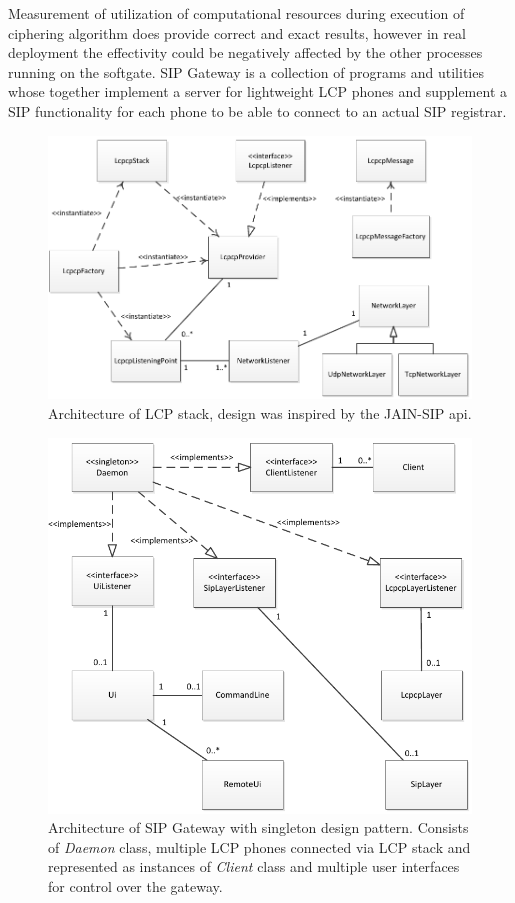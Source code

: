 Measurement of utilization of computational resources during execution of 
ciphering algorithm does provide correct and exact results, however in real 
deployment the effectivity could be negatively affected by the other processes 
running on the softgate. SIP Gateway is a collection of programs and utilities
whose together implement a server for lightweight LCP phones and supplement a
SIP functionality for each phone to be able to connect to an actual SIP 
registrar. 

\begin{figure}[h!]
\centering
\includegraphics[width=15cm]{fig/lcpstack.pdf}
\caption{Architecture of LCP stack, design was inspired by the JAIN-SIP 
api\cite{jainsip}.}
\label{lcpstack}
\end{figure}

\begin{figure}[h!]
\centering
\includegraphics[width=15cm]{fig/sipgw.pdf}
\caption{Architecture of SIP Gateway with singleton design pattern. Consists
of \textit{Daemon} class, multiple LCP phones connected via LCP stack and 
represented as instances of \textit{Client} class and multiple user interfaces
for control over the gateway.}
\label{gw}
\end{figure}

